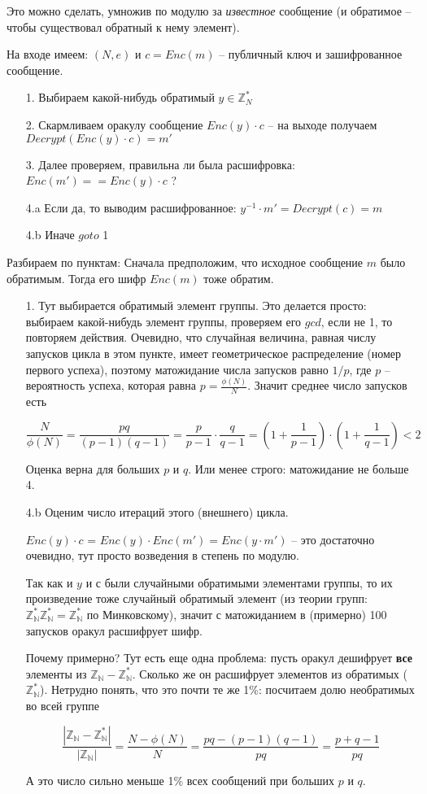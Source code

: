 \documentclass[russian]{article}
\begin{document}
Это можно сделать, умножив по модулю за \textit{известное} сообщение (и обратимое -- чтобы существовал обратный к нему элемент).

На входе имеем: $(N, e)$ и $c = Enc(m)$ -- публичный ключ и зашифрованное сообщение. 

\begin{itemize}
\item[1.] Выбираем какой-нибудь обратимый $y \in \mathbb{Z}^*_N$
\item[2.] Скармливаем оракулу сообщение $Enc(y) \cdot c$ -- на выходе получаем $Decrypt(Enc(y) \cdot c) = m'$
\item[3.] Далее проверяем, правильна ли была расшифровка: $Enc(m') == Enc(y) \cdot c$ ? 
\item[4.a] Если да, то выводим расшифрованное: $y^{-1} \cdot m' = Decrypt(c) = m$
\item[4.b] Иначе $goto$ 1
\end{itemize}

Разбираем по пунктам:
Сначала предположим, что исходное сообщение $m$ было обратимым. Тогда его шифр $Enc(m)$ тоже обратим.

\begin{itemize}
\item[1.] Тут выбирается обратимый элемент группы. Это делается просто: выбираем какой-нибудь элемент группы, проверяем его $gcd$, если не 1, то повторяем действия. Очевидно, что случайная величина, равная числу запусков цикла в этом пункте, имеет геометрическое распределение (номер первого успеха), поэтому матожидание числа запусков равно $1/p$, где $p$ -- вероятность успеха, которая равна $p = \frac{\phi(N)}{N}$. Значит среднее число запусков есть

\[\frac{N}{\phi(N)} = \frac{pq}{(p-1)(q-1)} = \frac{p}{p-1} \cdot \frac{q}{q-1} = \left(1 + \frac{1}{p-1}\right) \cdot \left(1 + \frac{1}{q-1}\right) < 2
\]

Оценка верна для больших $p$ и $q$. Или менее строго: матожидание не больше 4.

\item[4.b] Оценим число итераций этого (внешнего) цикла.

$Enc(y) \cdot c$ = $Enc(y) \cdot Enc(m') = Enc(y \cdot m')$ -- это достаточно очевидно, тут просто возведения в степень по модулю.

Так как и $y$ и $с$ были случайными обратимыми элементами группы, то их произведение тоже случайный обратимый элемент (из теории групп: $\mathbb{Z_N^*}\mathbb{Z_N^*}=\mathbb{Z_N^*}$ по Минковскому), значит с матожиданием в (примерно) 100 запусков оракул расшифрует шифр.

Почему примерно? Тут есть еще одна проблема: пусть оракул дешифрует \textbf{все} элементы из $\mathbb{Z_N} - \mathbb{Z_N^*}$. Сколько же он расшифрует элементов из обратимых ($\mathbb{Z_N^*}$). Нетрудно понять, что это почти те же 1\%: посчитаем долю необратимых во всей группе

\[
\frac{|\mathbb{Z_N} - \mathbb{Z_N^*}|}{|\mathbb{Z_N}|} = \frac{N - \phi(N)}{N} = \frac{pq - (p-1)(q-1)}{pq} = \frac{p+q-1}{pq}
\]

А это число сильно меньше 1\% всех сообщений при больших $p$ и $q$.
\end{itemize}
\end{document}
